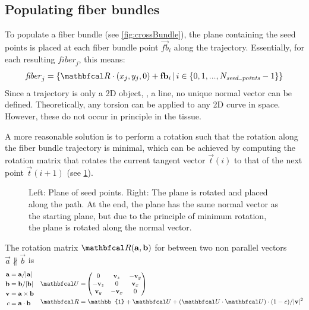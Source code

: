 \subsection{Populating fiber bundles}\label{sec:fillBundle}
%
To populate a fiber bundle (see \cref{fig:crossBundle}), the plane containing the seed points is placed at each fiber bundle point $\vec{fb}_i$ along the trajectory.
Essentially, for each resulting $\mathit{fiber}_j$, this means:
% 
\begin{align}
    \mathit{fiber}_j = \left\{ \mat{R} \cdot (x_j, y_j, 0) + \vec{fb}_i \, | \, i \in \{0,1,...,N_{\mathit{seed\tum{}points}}-1\}\right\}
\end{align}
% 
Since a trajectory is only a 2D object, \ie{}, a line, no unique normal vector can be defined.
Theoretically, any torsion can be applied to any 2D curve in space.
However, these do not occur in principle in the tissue.
\par
% 
A more reasonable solution is to perform a rotation such that the rotation along the fiber bundle trajectory is minimal, which can be achieved by computing the rotation matrix that rotates the current tangent vector $\vec{t}(i)$ to that of the next point $\vec{t}(i+1)$ (see \cref{fig:torsion}).
%
\begin{figure}[!t]
    \centering
    \setlength{\tikzwidth}{0.75\textwidth}
    \caption[]{Left: Plane of seed points. Right: The plane is rotated and placed along the path. At the end, the plane has the same normal vector as the starting plane, but due to the principle of minimum rotation, the plane is rotated along the normal vector.}
    \label{fig:torsion}
\end{figure}
% 
The rotation matrix $\mat{R}(\vec{a}, \vec{b})$ for between two non parallel vectors $\vec{a} \nparallel \vec{b}$ is
\begin{align}
\begin{split}
    \vec{a} =& \; \vec{a} / |\vec{a}|\\
    \vec{b} =& \; \vec{b} / |\vec{b}|\\
    \vec{v} =& \; \vec{a} \times \vec{b}\\
    c =& \; \vec{a} \cdot \vec{b}
\end{split}
\quad
\begin{split}
    \mat{U} =& \begin{pmatrix} 0 & \vec{v}_z & -\vec{v}_y\\ -\vec{v}_z & 0 & \vec{v}_x\\ \vec{v}_y & -\vec{v}_x & 0\end{pmatrix}\\
    \mat{R} =& \; \mathbb{1} + \mat{U} + (\mat{U} \cdot \mat{U}) \cdot (1 - c) / |\vec{v}|^2
\end{split}
\end{align}
